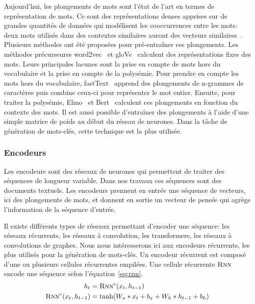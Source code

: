 Aujourd'hui, les plongements de mots sont l'état de l'art en termes de représentation de mots. Ce sont des représentations denses apprises sur de grandes quantités de données qui modélisent les cooccurrences entre les mots: deux mots utilisés dans des contextes similaires auront des vecteurs similaires~\cite{mikolov_efficient_2013}.
Plusieurs méthodes ont été proposées pour pré-entraîner ces plongements.
Les méthodes précurseures word2vec~\cite{mikolov_efficient_2013} et gloVe~\cite{pennington_glove_2014} calculent des représentations fixes des mots. Leurs principales lacunes sont la prise en compte de mots hors du vocabulaire et la prise en compte de la polysémie. Pour prendre en compte les mots hors du vocabulaire, fastText~\cite{bojanowski_enriching_2017} apprend des plongements de n-grammes de caractères puis combine ceux-ci pour représenter le mot entier. Ensuite, pour traiter la polysémie, Elmo~\cite{peters_deep_2018} et Bert~\cite{devlin_bert_2019} calculent ces plongements en fonction du contexte des mots.
Il est aussi possible d'entraîner des plongements à l'aide d'une simple matrice de poids au début du réseau de neurones. Dans la tâche de génération de mots-clés, cette technique est la plus utilisée.


\subsubsection{Encodeurs}

Les encodeurs sont des réseaux de neurones qui permettent de traiter des séquences de longueur variable. Dans nos travaux ces séquences sont des documents textuels.
Les encodeurs prennent en entrée une séquence de vecteurs, ici des plongements de mots, et donnent en sortie un vecteur de pensée qui agrège l'information de la séquence d'entrée.

Il existe différents types de réseaux permettant d'encoder une séquence: les réseaux récurrents, les réseaux à convolution, les transformers, les réseaux à convolutions de graphes.
Nous nous intéresserons ici aux encodeurs récurrents, les plus utilisés pour la génération de mots-clés. 
Un encodeur récurrent est composé d'une ou plusieurs cellules récurrentes empilées.
Une cellule récurrente $\textsc{Rnn}$ encode une séquence selon l'équation~\ref{eq:rnn}.
%
\begin{equation}\label{eq:rnn}
\begin{split}
    h_t & = \textsc{Rnn}^e(x_{t}, h_{t-1}) \\
    \textsc{Rnn}^e(x_t, h_{t-1}) & = \text{tanh}(W_x * x_t + b_x + W_h * h_{t-1} + b_h)
\end{split}
\end{equation}

